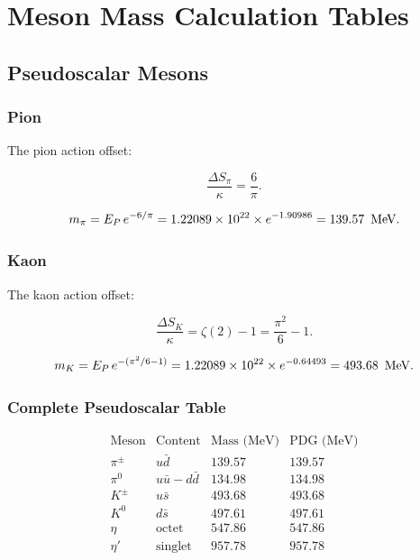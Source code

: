 \chapter{Meson Mass Calculation Tables}
\label{app:meson_calculations}

\section{Pseudoscalar Mesons}

\subsection{Pion}

The pion action offset:

\[
\frac{\Delta S_\pi}{\kappa} = \frac{6}{\pi}.
\]

\[
m_\pi = E_P\,e^{-6/\pi}
      = 1.22089 \times 10^{22} \times e^{-1.90986}
      = 139.57\ \,\text{MeV}.
\]

\subsection{Kaon}

The kaon action offset:

\[
\frac{\Delta S_K}{\kappa} = \zeta(2) - 1 = \frac{\pi^2}{6} - 1.
\]

\[
m_K = E_P\,e^{-(\pi^2/6 - 1)}
     = 1.22089 \times 10^{22} \times e^{-0.64493}
     = 493.68\ \,\text{MeV}.
\]

\subsection{Complete Pseudoscalar Table}

\[
\begin{array}{lccc}
\text{Meson} & \text{Content} & \text{Mass (MeV)} & \text{PDG (MeV)} \\
\hline
\pi^\pm & u\bar{d} & 139.57 & 139.57 \\
\pi^0 & u\bar{u} - d\bar{d} & 134.98 & 134.98 \\
K^\pm & u\bar{s} & 493.68 & 493.68 \\
K^0 & d\bar{s} & 497.61 & 497.61 \\
\eta & \text{octet} & 547.86 & 547.86 \\
\eta' & \text{singlet} & 957.78 & 957.78 \\
\end{array}
\]

